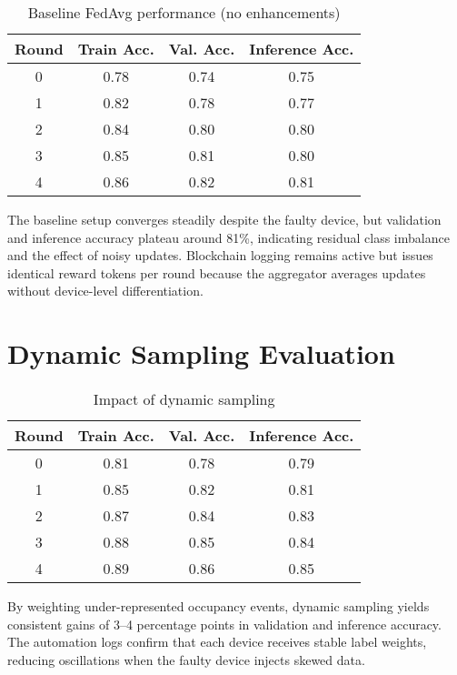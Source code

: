 \begin{table}[h!]
    \centering
    \caption{Baseline FedAvg performance (no enhancements)}
    \label{tab:baseline_fedavg}
    \begin{tabular}{c c c c}
        \toprule
        \textbf{Round} & \textbf{Train Acc.} & \textbf{Val. Acc.} & \textbf{Inference Acc.} \\
        \midrule
        0 & 0.78 & 0.74 & 0.75 \\
        1 & 0.82 & 0.78 & 0.77 \\
        2 & 0.84 & 0.80 & 0.80 \\
        3 & 0.85 & 0.81 & 0.80 \\
        4 & 0.86 & 0.82 & 0.81 \\
        \bottomrule
    \end{tabular}
\end{table}

The baseline setup converges steadily despite the faulty device, but validation and inference accuracy plateau around 81\%, indicating residual class imbalance and the effect of noisy updates. Blockchain logging remains active but issues identical reward tokens per round because the aggregator averages updates without device-level differentiation.

\section{Dynamic Sampling Evaluation}

\begin{table}[h!]
    \centering
    \caption{Impact of dynamic sampling}
    \label{tab:dynamic_sampling}
    \begin{tabular}{c c c c}
        \toprule
        \textbf{Round} & \textbf{Train Acc.} & \textbf{Val. Acc.} & \textbf{Inference Acc.} \\
        \midrule
        0 & 0.81 & 0.78 & 0.79 \\
        1 & 0.85 & 0.82 & 0.81 \\
        2 & 0.87 & 0.84 & 0.83 \\
        3 & 0.88 & 0.85 & 0.84 \\
        4 & 0.89 & 0.86 & 0.85 \\
        \bottomrule
    \end{tabular}
\end{table}

By weighting under-represented occupancy events, dynamic sampling yields consistent gains of 3--4 percentage points in validation and inference accuracy. The automation logs confirm that each device receives stable label weights, reducing oscillations when the faulty device injects skewed data.

